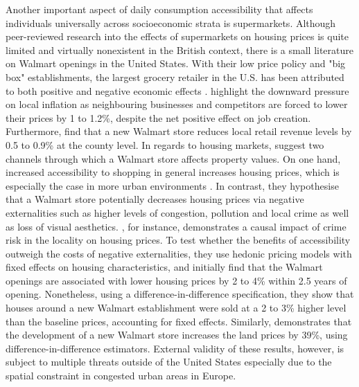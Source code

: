 \documentclass{article}
\begin{document}
Another important aspect of daily consumption accessibility that affects individuals universally across socioeconomic strata is supermarkets. Although peer-reviewed research into the effects of supermarkets on housing prices is quite limited and virtually nonexistent in the British context, there is a small literature on Walmart openings in the United States. With their low price policy and "big box" establishments, the largest grocery retailer in the U.S. has been attributed to both positive and negative economic effects \citep{TheEconomist2006OpeningEffect}. \citet{Basker2009TheIndustry} highlight the downward pressure on local inflation as neighbouring businesses and competitors are forced to lower their prices by 1 to 1.2\%, despite the net positive effect on job creation. Furthermore, \citet{Dube2007FirmSector} find that a new Walmart store reduces local retail revenue levels by 0.5 to 0.9\% at the county level. In regards to housing markets, \citet{Pope2015WhenAlways} suggest two channels through which a Walmart store affects property values. On one hand, increased accessibility to shopping in general increases housing prices, which is especially the case in more urban environments \citep{Emrath2002ExplainingPrices}. In contrast, they hypothesise that a Walmart store potentially decreases housing prices via negative externalities such as higher levels of congestion, pollution and local crime as well as loss of visual aesthetics. \citet{Linden2008EstimatesLaws}, for instance, demonstrates a causal impact of crime risk in the locality on housing prices. To test whether the benefits of accessibility outweigh the costs of negative externalities, they use hedonic pricing models with fixed effects on housing characteristics, and initially find that the Walmart openings are associated with lower housing prices by 2 to 4\% within 2.5 years of opening. Nonetheless, using a difference-in-difference specification, they show that houses around a new Walmart establishment were sold at a 2 to 3\% higher level than the baseline prices, accounting for fixed effects. Similarly, \citet{Slade2016Walmart} demonstrates that the development of a new Walmart store increases the land prices by 39\%, using difference-in-difference estimators. External validity of these results, however, is subject to multiple threats outside of the United States especially due to the spatial constraint in congested urban areas in Europe.
\end{document}
